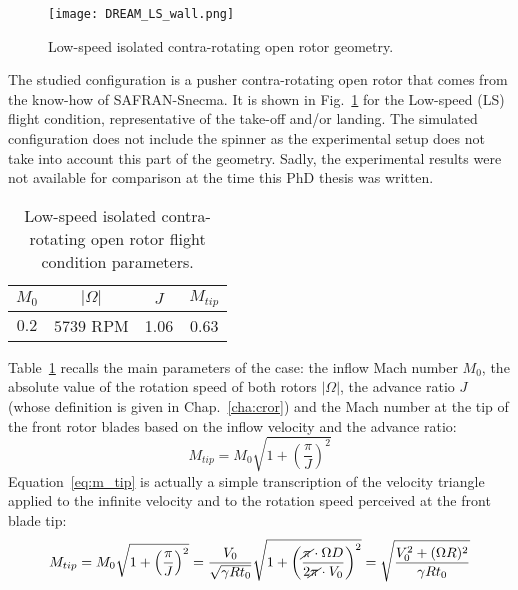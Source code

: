 

\begin{figure}[htp]
  \centering
  \texttt{[image: DREAM\_LS\_wall.png]}
  \caption{Low-speed isolated contra-rotating open rotor geometry.}
  \label{fig:dream_ls_wall}
\end{figure}

The studied configuration is a pusher contra-rotating open rotor
that comes from the know-how of SAFRAN-Snecma. 
It is shown in Fig.~\ref{fig:dream_ls_wall} for the
Low-speed (LS) flight condition, representative of the take-off
and/or landing.
The simulated configuration does not include the spinner as the
experimental setup does not take into account this part of the geometry.
Sadly, the experimental results were not available for comparison
at the time this PhD thesis was written.

\begin{table}[htp]
   \centering
  \begin{tabular}{cccc}
    \toprule
    $M_0$ & $|\Omega|$ & $J$ & $M_{tip}$ \\
    \midrule
    $0.2$ & $5739$ RPM & 1.06 & 0.63 \\
    \bottomrule
  \end{tabular}
  \caption{Low-speed isolated contra-rotating open rotor flight condition parameters.}
  \label{tab:dream_ls_flight_condition}
\end{table} 
Table~\ref{tab:dream_ls_flight_condition} recalls the main
parameters of the case: the inflow Mach number $M_0$,
the absolute value of the rotation speed of both rotors $|\Omega|$,
the advance ratio $J$ (whose definition is given in Chap.~\ref{cha:cror})
and the Mach number at the tip of
the front rotor blades based on the inflow velocity and the advance ratio:
\begin{equation}
	M_{tip} = M_0 \sqrt{1 + \left(\frac{\pi}{J} \right)^2}
  \label{eq:m_tip}
\end{equation}
Equation~\ref{eq:m_tip} is actually a simple transcription of the velocity triangle
applied to the infinite velocity and to the rotation speed perceived
at the front blade tip:
\begin{equation}
    M_{tip} = M_0 \sqrt{1 + \left(\frac{\pi}{J}\right)^2} = 
    \frac{V_0}{\sqrt{\gamma R t_0}} \sqrt{1 + \left(\frac{
    	\cancel{\pi} \cdot \Omega D}{
    	2 \cancel{\pi} \cdot V_0}\right)^2} =
    \sqrt{\frac{V_0^2 + (\Omega R)^2}{\gamma R t_0}}
    \label{eq:m_tip_explained}
\end{equation}

